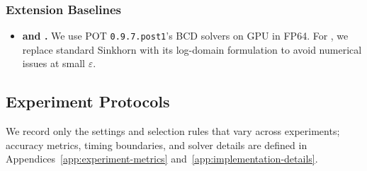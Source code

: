 \subsubsection{Extension Baselines}
\label{app:implementation-ufgw}
\begin{itemize}
\item \textbf{\bcdmm and \bcdsinkhorn.}
We use POT \texttt{0.9.7.post1}'s BCD solvers on GPU in FP64.
For \bcdsinkhorn, we replace standard Sinkhorn with its log-domain formulation to avoid numerical issues at small $\varepsilon$.
\end{itemize}

\subsection{Experiment Protocols}
\label{app:task-protocols}

We record only the settings and selection rules that vary across experiments; accuracy metrics, timing boundaries, and solver details are defined in Appendices~\ref{app:experiment-metrics} and~\ref{app:implementation-details}.

